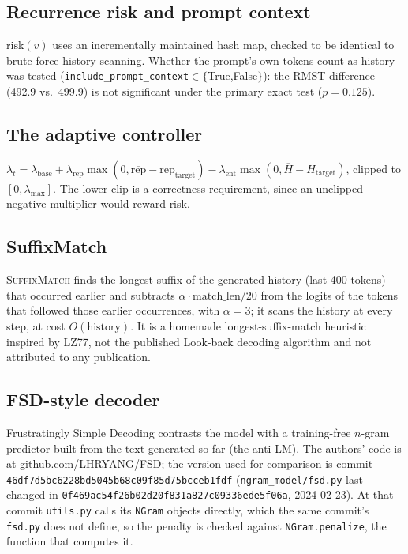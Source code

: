 \documentclass[make,article,submit,pdftex]{Definitions/mdpi}
\newcommand{\risk}{\mathrm{risk}}
\begin{document}
\subsection{Recurrence risk and prompt context}
$\risk(v)$ uses an incrementally maintained hash map, checked to be identical to brute-force history scanning. Whether the prompt's own tokens count as history was tested (\texttt{include\_\allowbreak{}prompt\_\allowbreak{}context}$\in\{$True,False$\}$): the RMST difference (492.9 vs.\ 499.9) is not significant under the primary exact test ($p{=}0.125$).

\subsection{The adaptive controller}
$\lambda_t=\lambda_{\text{base}}+\lambda_{\text{rep}}\max(0,\overline{\text{rep}}-\text{rep}_{\text{target}})-\lambda_{\text{ent}}\max(0,\overline{H}-H_{\text{target}})$, clipped to $[0,\lambda_{\max}]$. The lower clip is a correctness requirement, since an unclipped negative multiplier would reward risk.

\subsection{SuffixMatch}
\textsc{SuffixMatch} finds the longest suffix of the generated history (last 400 tokens) that occurred earlier and subtracts $\alpha\cdot\text{match\_len}/20$ from the logits of the tokens that followed those earlier occurrences, with $\alpha{=}3$; it scans the history at every step, at cost $O(\text{history})$. It is a homemade longest-suffix-match heuristic inspired by LZ77, not the published Look-back decoding algorithm and not attributed to any publication.

\subsection{FSD-style decoder}
\label{app:fsd}
Frustratingly Simple Decoding \cite{yang2023frustratingly} contrasts the model with a training-free $n$-gram predictor built from the text generated so far (the anti-LM). The authors' code is at github.com/LHRYANG/FSD; the version used for comparison is commit \texttt{46df7d5bc622\allowbreak{}8bd5045b68c0\allowbreak{}9f85d75bcceb\allowbreak{}1fdf} (\texttt{ngram\_model/fsd.py} last changed in \texttt{0f469ac54f26\allowbreak{}b02d20f831a8\allowbreak{}27c09336ede5\allowbreak{}f06a}, 2024-02-23). At that commit \texttt{utils.py} calls its \texttt{NGram} objects directly, which the same commit's \texttt{fsd.py} does not define, so the penalty is checked against \texttt{NGram.penalize}, the function that computes it.
\end{document}

